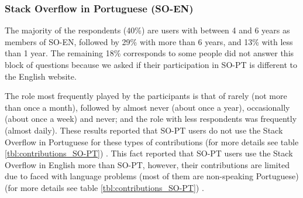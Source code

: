 \subsubsection{Stack Overflow in Portuguese (SO-EN)}
The majority of the respondents (40\%) are users with between 4 and 6 years as members of SO-EN, followed by 29\% with more than 6 years, and 13\% with less than 1 year. The remaining 18\% corresponds to some people did not answer this block of questions because we asked if their participation in SO-PT is different to the English website.

The role most frequently played by the participants is that of rarely (not more than once a month), followed by almost never (about once a year), occasionally (about once a week) and never; and the role with less respondents was frequently (almost daily). These results reported that SO-PT users do not use the Stack Overflow in Portuguese for these types of contributions (for more details see table \ref{tbl:contributions_SO-PT}) . This fact reported that SO-PT users use the Stack Overflow in English more than SO-PT, however, their contributions are limited due to faced with language problems (most of them are non-speaking Portuguese) (for more details see table \ref{tbl:contributions_SO-PT}) .  

